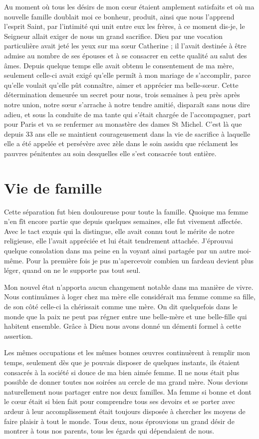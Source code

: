 \documentclass[11pt,a4paper]{report}
\begin{document}
Au moment où tous les désirs de mon cœur étaient amplement satisfaits et où ma nouvelle famille doublait moi ce bonheur, produit, ainsi que nous l'apprend l'esprit Saint, par l'intimité qui unit entre eux les frères, à ce moment dis-je, le Seigneur allait exiger de nous un grand sacrifice. Dieu par une vocation particulière avait jeté les yeux sur ma sœur Catherine ; il l'avait destinée à être admise au nombre de ses épouses et à se consacrer en cette qualité au salut des âmes. Depuis quelque temps elle avait obtenu le consentement de ma mère, seulement celle-ci avait exigé qu'elle permît à mon mariage de s'accomplir, parce qu'elle voulait qu'elle pût connaître, aimer et apprécier ma belle-sœur. Cette détermination demeurée un secret pour nous, trois semaines à peu près après notre union, notre sœur s'arrache à notre tendre amitié, disparaît sans nous dire adieu, et sous la conduite de ma tante qui s'était chargée de l'accompagner, part pour Paris et va se renfermer au monastère des dames St Michel. C'est là que depuis 33 ans elle se maintient courageusement dans la vie de sacrifice à laquelle elle a été appelée et persévère avec zèle dans le soin assidu que réclament les pauvres pénitentes au soin desquelles elle s'est consacrée tout entière.

\section*{Vie de famille}

Cette séparation fut bien douloureuse pour toute la famille. Quoique ma femme n'en fît encore partie que depuis quelques semaines, elle fut vivement affectée. Avec le tact exquis qui la distingue, elle avait connu tout le mérite de notre religieuse, elle l'avait appréciée et lui était tendrement attachée. J'éprouvai quelque consolation dans ma peine en la voyant ainsi partagée par un autre moi-même. Pour la première fois je pus m'apercevoir combien un fardeau devient plus léger, quand on ne le supporte pas tout seul.

Mon nouvel état n'apporta aucun changement notable dans ma manière de vivre. Nous continuâmes à loger chez ma mère elle considérait ma femme comme sa fille, de son côté celle-ci la chérissait comme une mère. On dit quelquefois dans le monde que la paix ne peut pas régner entre une belle-mère et une belle-fille qui habitent ensemble. Grâce à Dieu nous avons donné un démenti formel à cette assertion.

Les mêmes occupations et les mêmes bonnes œuvres continuèrent à remplir mon temps, seulement dès que je pouvais disposer de quelques instants, ils étaient consacrés à la société si douce de ma bien aimée femme. Il ne nous était plus possible de donner toutes nos soirées au cercle de ma grand mère. Nous devions naturellement nous partager entre nos deux familles. Ma femme si bonne et dont le cœur était si bien fait pour comprendre tous ses devoirs et se porter avec ardeur à leur accomplissement était toujours disposée à chercher les moyens de faire plaisir à tout le monde. Tous deux, nous éprouvions un grand désir de montrer à tous nos parents, tous les égards qui dépendaient de nous.
\end{document}
